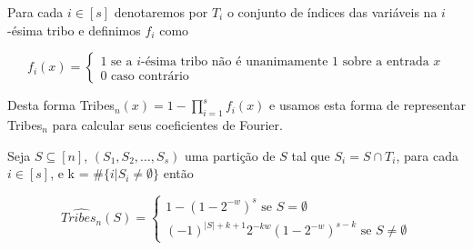 Para cada $i \in [s]$ denotaremos por $T_{i}$ o conjunto de índices das variáveis na $i$-ésima tribo e definimos $f_{i}$ como

\begin{equation*}
    f_{i}(x) = \begin{cases}
                    1 \text{ se a } i\text{-ésima tribo não é unanimamente 1 sobre a entrada } x \\
                    0 \text{ caso contrário}
               \end{cases}
\end{equation*}

Desta forma Tribes$_{n}(x) = 1 - \prod_{i = 1}^{s} f_{i}(x)$ e usamos esta forma de representar Tribes$_{n}$ para calcular seus coeficientes de Fourier.

\begin{prop} \label{prop: tribes_fourier_coef}

    Seja $S \subseteq [n]$, $(S_{1}, S_{2}, \dots, S_{s})$ uma partição de $S$ tal que $S_{i} = S \cap T_{i}$, para cada $i \in [s]$, e k = $\#\{i \rvert S_{i} \neq \emptyset\}$ então

    \begin{equation*}
    \widehat{Tribes_{n}}(S) = \begin{cases}
                                   1 - (1 - 2^{-w})^{s} \text{ se } S = \emptyset \\
                                   (-1)^{\lvert S \rvert + k + 1}2^{-kw}(1 - 2^{-w})^{s - k} \text{ se } S \neq \emptyset
                               \end{cases}
    \end{equation*}

\end{prop}

